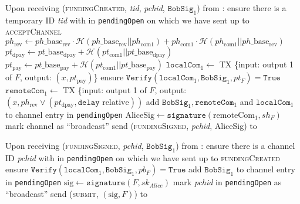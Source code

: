 \begin{algorithmic}[1]
    \State Upon receiving (\textsc{fundingCreated}, \textit{tid},
    \textit{pchid}, $\mathtt{BobSig}_1$) from \bob:
    \Indent
      \State ensure there is a temporary ID \textit{tid} with \bob{} in
      \texttt{pendingOpen} on which we have sent up to \textsc{acceptChannel}
      \State $ph_{\mathrm{rev}} \gets ph\_\mathrm{base}_{\mathrm{rev}} \cdot
      \mathcal{H}\left(ph\_\mathrm{base}_{\mathrm{rev}} ||
      ph_{\mathrm{com}1}\right) + ph_{\mathrm{com}1} \cdot \mathcal{H}\left(
      ph_{\mathrm{com}1} || ph\_\mathrm{base}_{\mathrm{rev}}\right)$
      \State $pt_{\mathrm{dpay}} \gets pt\_\mathrm{base}_{\mathrm{dpay}} +
      \mathcal{H}\left(pt_{\mathrm{com}1} ||
      pt\_\mathrm{base}_{\mathrm{dpay}}\right)$
      \State $pt_{\mathrm{pay}} \gets pt\_\mathrm{base}_{\mathrm{pay}} +
      \mathcal{H}\left(pt_{\mathrm{com}1} ||
      pt\_\mathrm{base}_{\mathrm{pay}}\right)$
      \State $\mathtt{localCom}_1 \gets$ TX \{input: output 1 of $F$, output:
      $\left(x, pt_{\mathrm{pay}}\right)$\}
      \State ensure $\mathtt{Verify}\left(\mathtt{localCom}_1,
      \mathtt{BobSig}_1, pt_F\right) = \mathtt{True}$
      \State $\mathtt{remoteCom}_1 \gets$ TX \{input: output 1 of $F$, output:
      $\left(x, ph_{\mathrm{rev}} \vee \left(pt_{\mathrm{dpay}}, \mathtt{delay}
      \text{ relative}\right)\right)$ 
      \State add $\mathtt{BobSig}_1, \mathtt{remoteCom}_1$ and
      $\mathtt{localCom}_1$ to channel entry in \texttt{pendingOpen}
      \State $\mathrm{AliceSig} \gets
      \mathtt{signature}\left(\mathrm{remoteCom}_1, sh_F\right)$
      \State mark channel as ``broadcast''
      \State send (\textsc{fundingSigned}, \textit{pchid}, AliceSig) to \bob
    \EndIndent
    \State

    \State Upon receiving (\textsc{fundingSigned}, \textit{pchid},
    $\mathtt{BobSig}_1$) from \bob:
    \Indent
      \State ensure there is a channel ID \textit{pchid} with \bob{} in
      \texttt{pendingOpen} on which we have sent up to \textsc{fundingCreated}
      \State ensure $\mathtt{Verify}\left(\mathtt{localCom}_1,
      \mathtt{BobSig}_1, pb_F\right) = \mathtt{True}$
      \State add $\mathtt{BobSig}_1$ to channel entry in \texttt{pendingOpen}
      \State $\mathrm{sig} \gets \mathtt{signature}\left(F,
      sk_{\mathit{Alice}}\right)$
      \State mark \textit{pchid} in \texttt{pendingOpen} as ``broadcast''
      \State send (\textsc{submit}, $\left(\mathrm{sig}, F\right)$) to \ledger
    \EndIndent
    \State


\end{algorithmic}
